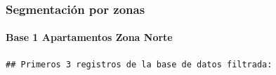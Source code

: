 \documentclass[
]{article}
\begin{document}
\subsubsection{\texorpdfstring{\textbf{Segmentación por
zonas}}{Segmentación por zonas}}\label{segmentaciuxf3n-por-zonas}

\paragraph{\texorpdfstring{\textbf{Base 1 Apartamentos Zona
Norte}}{Base 1 Apartamentos Zona Norte}}\label{base-1-apartamentos-zona-norte}

\begin{verbatim}
## Primeros 3 registros de la base de datos filtrada:
\end{verbatim}
\end{document}
